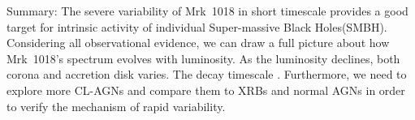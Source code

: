 \documentclass[twocolumn]{aastex63}
\begin{document}












Summary:
The severe variability of Mrk~1018 in short timescale provides a good target for intrinsic activity of individual Super-massive Black Holes(SMBH). Considering all observational evidence, we can draw a full picture about how Mrk~1018's spectrum evolves with luminosity. As the luminosity declines, both corona and accretion disk varies. The decay timescale  . Furthermore, we need to explore more CL-AGNs and compare them to XRBs and normal AGNs in order to verify the mechanism of rapid variability.  



\acknowledgments



%
\end{document}
